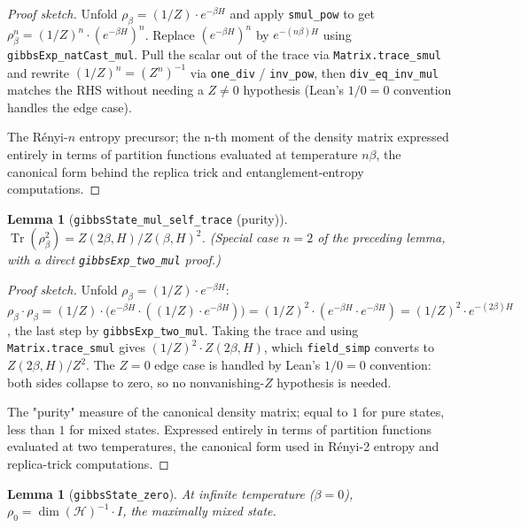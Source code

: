\documentclass[a4paper,11pt]{article}
\newtheorem{lemma}[theorem]{Lemma}
\begin{document}
\begin{proof}[Proof sketch]
Unfold $\rho_\beta = (1/Z) \cdot e^{-\beta H}$ and apply
\texttt{smul\_pow} to get
$\rho_\beta^n = (1/Z)^n \cdot (e^{-\beta H})^n$.  Replace
$(e^{-\beta H})^n$ by $e^{-(n\beta) H}$ using
\texttt{gibbsExp\_natCast\_mul}.  Pull the scalar out of the trace
via \texttt{Matrix.trace\_smul} and rewrite
$(1/Z)^n = (Z^n)^{-1}$ via \texttt{one\_div} / \texttt{inv\_pow},
then \texttt{div\_eq\_inv\_mul} matches the RHS without needing a
$Z \neq 0$ hypothesis (Lean's $1/0 = 0$ convention handles the
edge case).

The Rényi-$n$ entropy precursor; the n-th moment of the density
matrix expressed entirely in terms of partition functions evaluated
at temperature $n \beta$, the canonical form behind the replica trick
and entanglement-entropy computations.
\end{proof}

\begin{lemma}[\texttt{gibbsState\_mul\_self\_trace} (purity)]
$\operatorname{Tr}(\rho_\beta^2)
 = Z(2\beta, H) / Z(\beta, H)^2$. (Special case $n = 2$ of the
preceding lemma, with a direct \texttt{gibbsExp\_two\_mul} proof.)
\end{lemma}

\begin{proof}[Proof sketch]
Unfold $\rho_\beta = (1/Z) \cdot e^{-\beta H}$:
$\rho_\beta \cdot \rho_\beta
 = (1/Z) \cdot \bigl(e^{-\beta H} \cdot ((1/Z) \cdot e^{-\beta H})\bigr)
 = (1/Z)^2 \cdot (e^{-\beta H} \cdot e^{-\beta H})
 = (1/Z)^2 \cdot e^{-(2\beta) H}$,
the last step by \texttt{gibbsExp\_two\_mul}.  Taking the trace and
using \texttt{Matrix.trace\_smul} gives $(1/Z)^2 \cdot Z(2\beta, H)$,
which \texttt{field\_simp} converts to $Z(2\beta, H) / Z^2$.
The $Z = 0$ edge case is handled by Lean's $1/0 = 0$ convention:
both sides collapse to zero, so no nonvanishing-$Z$ hypothesis is
needed.

The "purity" measure of the canonical density matrix; equal to $1$
for pure states, less than $1$ for mixed states.  Expressed entirely
in terms of partition functions evaluated at two temperatures, the
canonical form used in Rényi-2 entropy and replica-trick computations.
\end{proof}

\begin{lemma}[\texttt{gibbsState\_zero}]
At infinite temperature ($\beta = 0$),
$\rho_0 = \dim(\mathcal{H})^{-1} \cdot I$, the maximally mixed state.
\end{lemma}
\end{document}
